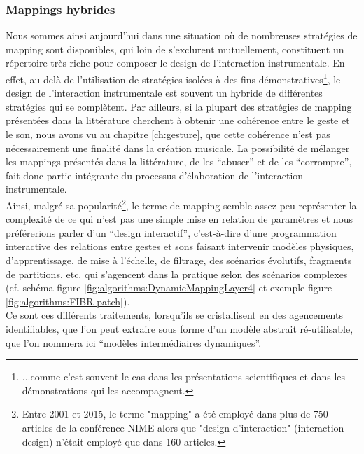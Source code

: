 \subsubsection{Mappings hybrides} 

\noindent Nous sommes ainsi aujourd'hui dans une situation où de nombreuses stratégies de mapping sont disponibles, qui loin de s'exclurent mutuellement, constituent un répertoire très riche pour composer le design de l'interaction instrumentale. En effet, au-delà de l'utilisation de stratégies isolées à des fins démonstratives\footnote{...comme c'est souvent le cas dans les présentations scientifiques et dans les démonstrations qui les accompagnent.}, le design de l'interaction instrumentale est souvent un hybride de différentes stratégies qui se complètent. Par ailleurs, si la plupart des stratégies de mapping présentées dans la littérature cherchent à obtenir une cohérence entre le geste et le son, nous avons vu au chapitre \ref{ch:gesture}, que cette cohérence n'est pas nécessairement une finalité dans la création musicale. La possibilité de mélanger les mappings présentés dans la littérature, de les ``abuser'' et de les ``corrompre'', fait donc partie intégrante du processus d'élaboration de l'interaction instrumentale.\\
\indent Ainsi, malgré sa popularité\footnote{Entre 2001 et 2015, le terme "mapping" a été employé dans plus de 750 articles de la conférence \gls{NIME} alors que "design d'interaction" (interaction design) n'était employé que dans 160 articles.}, le terme de mapping semble assez peu représenter la complexité de ce qui n'est pas une simple mise en relation de paramètres et nous préférerions parler d'un ``design interactif'', c'est-à-dire d'une programmation interactive des relations entre gestes et sons faisant intervenir modèles physiques, d'apprentissage, de mise à l'échelle, de filtrage, des scénarios évolutifs, fragments de partitions, etc. qui s'agencent dans la pratique selon des scénarios complexes (cf. schéma figure \ref{fig:algorithms:DynamicMappingLayer4} et exemple figure \ref{fig:algorithms:FIBR-patch}).\\
\noindent Ce sont ces différents traitements, lorsqu'ils se cristallisent en des agencements identifiables, que l'on peut extraire sous forme d'un modèle abstrait ré-utilisable, que l'on nommera ici ``modèles intermédiaires dynamiques''.


